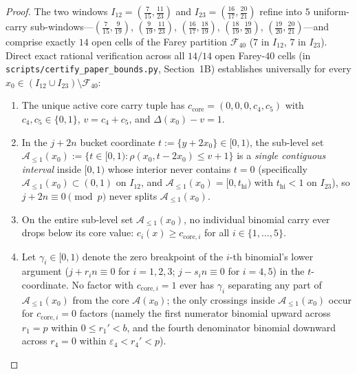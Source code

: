 \documentclass[11pt,reqno]{amsart}
\theoremstyle{definition}
\theoremstyle{remark}
\begin{document}
\begin{proof}
The two windows $I_{12} = (\frac{7}{15}, \frac{11}{23})$ and $I_{23} = (\frac{16}{17}, \frac{20}{21})$ refine into $5$ uniform-carry sub-windows—$(\frac{7}{15},\frac{9}{19})$, $(\frac{9}{19},\frac{11}{23})$, $(\frac{16}{17},\frac{18}{19})$, $(\frac{18}{19},\frac{19}{20})$, $(\frac{19}{20},\frac{20}{21})$—and comprise exactly $14$ open cells of the Farey partition $\mathcal{F}_{40}$ ($7$ in $I_{12}$, $7$ in $I_{23}$). Direct exact rational verification across all $14/14$ open Farey-$40$ cells (in \texttt{scripts/certify\_paper\_bounds.py}, Section~1B) establishes universally for every $x_0 \in (I_{12} \cup I_{23}) \setminus \mathcal{F}_{40}$:
\begin{enumerate}
  \item[(S1)] The unique active core carry tuple has $c_{\mathrm{core}} = (0, 0, 0, c_4, c_5)$ with $c_4, c_5 \in \{0, 1\}$, $v = c_4 + c_5$, and $\Delta(x_0) - v = 1$.
  \item[(S2)] In the $j + 2n$ bucket coordinate $t := \{y + 2x_0\} \in [0, 1)$, the sub-level set $\mathcal{A}_{\le 1}(x_0) := \{t \in [0, 1) : \rho(x_0, t - 2x_0) \le v + 1\}$ is a \emph{single contiguous interval} inside $[0, 1)$ whose interior never contains $t = 0$ (specifically $\mathcal{A}_{\le 1}(x_0) \subset (0, 1)$ on $I_{12}$, and $\mathcal{A}_{\le 1}(x_0) = [0, t_{\mathrm{hi}})$ with $t_{\mathrm{hi}} < 1$ on $I_{23}$), so $j + 2n \equiv 0 \pmod p$ never splits $\mathcal{A}_{\le 1}(x_0)$.
  \item[(S3)] On the entire sub-level set $\mathcal{A}_{\le 1}(x_0)$, no individual binomial carry ever drops below its core value: $c_i(x) \ge c_{\mathrm{core}, i}$ for all $i \in \{1, \ldots, 5\}$.
  \item[(S4)] Let $\gamma_i \in [0, 1)$ denote the zero breakpoint of the $i$-th binomial's lower argument ($j + r_i n \equiv 0$ for $i = 1,2,3$; $j - s_i n \equiv 0$ for $i = 4,5$) in the $t$-coordinate. No factor with $c_{\mathrm{core}, i} = 1$ ever has $\gamma_i$ separating any part of $\mathcal{A}_{\le 1}(x_0)$ from the core $\mathcal{A}(x_0)$; the only crossings inside $\mathcal{A}_{\le 1}(x_0)$ occur for $c_{\mathrm{core}, i} = 0$ factors (namely the first numerator binomial upward across $r_1 = p$ within $0 \le r_1' < b$, and the fourth denominator binomial downward across $r_4 = 0$ within $\varepsilon_4 < r_4' < p$).
\end{enumerate}


\end{proof}
\end{document}
